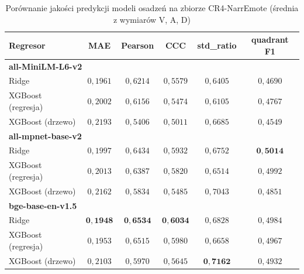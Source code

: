 \begin{table}[htbp]
    \centering
    \small
    \caption{Porównanie jakości predykcji modeli osadzeń na zbiorze CR4-NarrEmote (średnia z wymiarów V, A, D)}
    \begin{tabular}{l c c c c c}
        \toprule
        \textbf{Regresor} & \textbf{MAE} & \textbf{Pearson} & \textbf{CCC} & \textbf{std\_ratio} & \textbf{quadrant F1} \\
        \midrule
        \multicolumn{6}{l}{\textbf{all-MiniLM-L6-v2}} \\
        \hspace{1em}Ridge              & $0{,}1961$ & $0{,}6214$ & $0{,}5579$ & $0{,}6405$ & $0{,}4690$ \\
        \hspace{1em}XGBoost (regresja) & $0{,}2002$ & $0{,}6156$ & $0{,}5474$ & $0{,}6105$ & $0{,}4767$ \\
        \hspace{1em}XGBoost (drzewo)   & $0{,}2193$ & $0{,}5406$ & $0{,}5011$ & $0{,}6685$ & $0{,}4549$ \\
        \midrule
        \multicolumn{6}{l}{\textbf{all-mpnet-base-v2}} \\
        \hspace{1em}Ridge              & $0{,}1997$ & $0{,}6434$ & $0{,}5932$ & $0{,}6752$ & $\mathbf{0{,}5014}$ \\
        \hspace{1em}XGBoost (regresja) & $0{,}2013$ & $0{,}6387$ & $0{,}5820$ & $0{,}6514$ & $0{,}4992$ \\
        \hspace{1em}XGBoost (drzewo)   & $0{,}2162$ & $0{,}5834$ & $0{,}5485$ & $0{,}7043$ & $0{,}4851$ \\
        \midrule
        \multicolumn{6}{l}{\textbf{bge-base-en-v1.5}} \\
        \hspace{1em}Ridge              & $\mathbf{0{,}1948}$ & $\mathbf{0{,}6534}$ & $\mathbf{0{,}6034}$ & $0{,}6828$ & $0{,}4984$ \\
        \hspace{1em}XGBoost (regresja) & $0{,}1953$ & $0{,}6515$ & $0{,}5980$ & $0{,}6658$ & $0{,}4967$ \\
        \hspace{1em}XGBoost (drzewo)   & $0{,}2103$ & $0{,}5970$ & $0{,}5645$ & $\mathbf{0{,}7162}$ & $0{,}4932$ \\
        \bottomrule
    \end{tabular}
    \label{tab:embedding_quality_comp}
\end{table}


